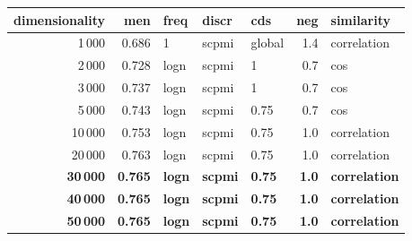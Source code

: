 \begin{tabular}{rrlllrl}
\toprule
 dimensionality &    men &  freq &  discr &     cds &  neg &   similarity \\
\midrule
           1\,000 &  0.686 &     1 &  scpmi &  global &  1.4 &  correlation \\
           2\,000 &  0.728 &  logn &  scpmi &       1 &  0.7 &          cos \\
           3\,000 &  0.737 &  logn &  scpmi &       1 &  0.7 &          cos \\
           5\,000 &  0.743 &  logn &  scpmi &    0.75 &  0.7 &          cos \\
          10\,000 &  0.753 &  logn &  scpmi &    0.75 &  1.0 &  correlation \\
          20\,000 &  0.763 &  logn &  scpmi &    0.75 &  1.0 &  correlation \\
          \textbf{30\,000} &  \textbf{0.765} &  \textbf{logn} &  \textbf{scpmi} &    \textbf{0.75} &  \textbf{1.0} &  \textbf{correlation} \\
          \textbf{40\,000} &  \textbf{0.765} &  \textbf{logn} &  \textbf{scpmi} &    \textbf{0.75} &  \textbf{1.0} &  \textbf{correlation} \\
          \textbf{50\,000} &  \textbf{0.765} &  \textbf{logn} &  \textbf{scpmi} &    \textbf{0.75} &  \textbf{1.0} &  \textbf{correlation} \\
\bottomrule
\end{tabular}
